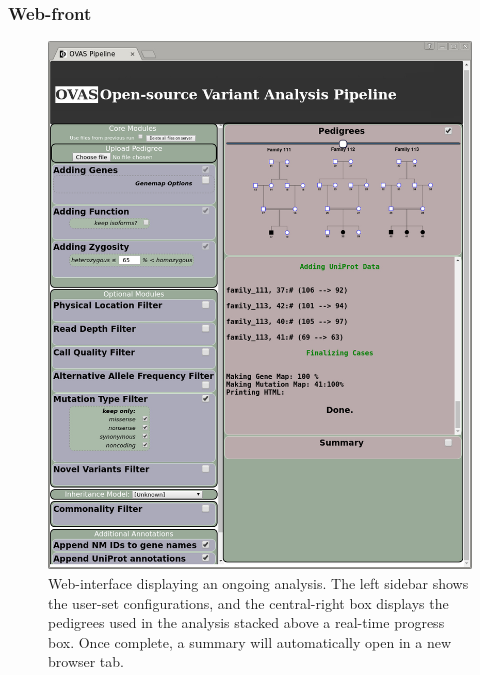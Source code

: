 \documentclass{bioinfo}
\begin{document}
\begin{methods}
\subsubsection{Web-front}

\begin{figure}[!tpb]
  \centerline{\includegraphics[natwidth=220bp,natheight=240bp]{pipe_3_final.jpg}}\caption{Web-interface displaying an ongoing analysis. The left sidebar shows the user-set configurations, and the central-right box displays the pedigrees used in the analysis stacked above a real-time progress box. Once complete, a summary will automatically open in a new browser tab.}\label{fig:webend}
\end{figure}
\begin{figure}[!tpb]

\end{figure}
\end{methods}
\end{document}

